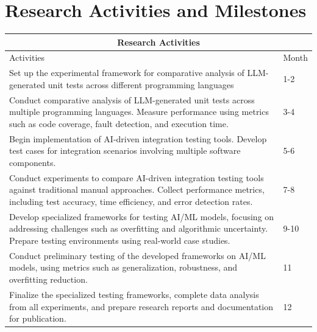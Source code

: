 \documentclass[12pt,a4paper]{article}
\begin{document}
\section{Research Activities and Milestones}
\begin{center}
\begin{tabular}{ |p{10cm}|p{5cm}|}
 \hline
 \multicolumn{2}{|c|}{Research Activities} \\
 \hline
 Activities & Month \\
 \hline
 Set up the experimental framework for comparative analysis of LLM-generated unit tests across different programming languages   & 1-2    \\
 \hline
 Conduct comparative analysis of LLM-generated unit tests across multiple programming languages. Measure performance using metrics such as code coverage, fault detection, and execution time. & 3-4 \\
 \hline
Begin implementation of AI-driven integration testing tools. Develop test cases for integration scenarios involving multiple software components. & 5-6 \\
\hline
Conduct experiments to compare AI-driven integration testing tools against traditional manual approaches. Collect performance metrics, including test accuracy, time efficiency, and error detection rates. & 7-8 \\
\hline
Develop specialized frameworks for testing AI/ML models, focusing on addressing challenges such as overfitting and algorithmic uncertainty. Prepare testing environments using real-world case studies. & 9-10 \\
\hline
Conduct preliminary testing of the developed frameworks on AI/ML models, using metrics such as generalization, robustness, and overfitting reduction. & 11 \\
\hline
 Finalize the specialized testing frameworks, complete data analysis from all experiments, and prepare research reports and documentation for publication. & 12 \\
 \hline 
\end{tabular}
\end{center}
\end{document}
